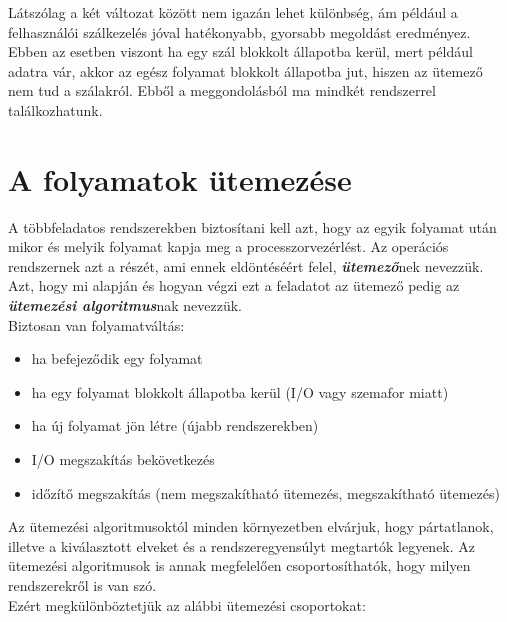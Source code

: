 \documentclass[tikz,12pt,margin=0px]{article}
\begin{document}
    \noindent Látszólag a két változat között nem igazán lehet különbség, ám például a felhasználói szálkezelés jóval hatékonyabb, gyorsabb megoldást eredményez. Ebben az esetben viszont ha egy szál blokkolt állapotba kerül, mert például adatra vár, akkor az egész folyamat blokkolt állapotba jut, hiszen az ütemező nem tud a szálakról. Ebből a meggondolásból ma mindkét rendszerrel találkozhatunk.

    \section*{A folyamatok ütemezése}

    \noindent A többfeladatos rendszerekben biztosítani kell azt, hogy az egyik folyamat után mikor és melyik folyamat kapja meg a processzorvezérlést. Az operációs rendszernek azt a részét, ami ennek eldöntéséért felel, \textbf{\emph{ütemező}}nek nevezzük. Azt, hogy mi alapján és hogyan végzi ezt a feladatot az ütemező pedig az \emph{\textbf{ütemezési algoritmus}}nak nevezzük.\\

    \noindent Biztosan van folyamatváltás:
    \begin{itemize}[topsep=8pt,itemsep=4pt,partopsep=4pt, parsep=4pt]
        \item ha befejeződik egy folyamat
        \item ha egy folyamat blokkolt állapotba kerül (I/O vagy szemafor miatt)
        \item ha új folyamat jön létre (újabb rendszerekben)
        \item I/O megszakítás bekövetkezés
        \item időzítő megszakítás (nem megszakítható ütemezés, megszakítható ütemezés) \\
    \end{itemize}

    \noindent Az ütemezési algoritmusoktól minden környezetben elvárjuk, hogy pártatlanok, illetve a kiválasztott elveket és a rendszeregyensúlyt megtartók legyenek. Az ütemezési algoritmusok is annak megfelelően csoportosíthatók, hogy milyen rendszerekről is van szó.\\

    \noindent Ezért megkülönböztetjük az alábbi ütemezési csoportokat:
\end{document}
